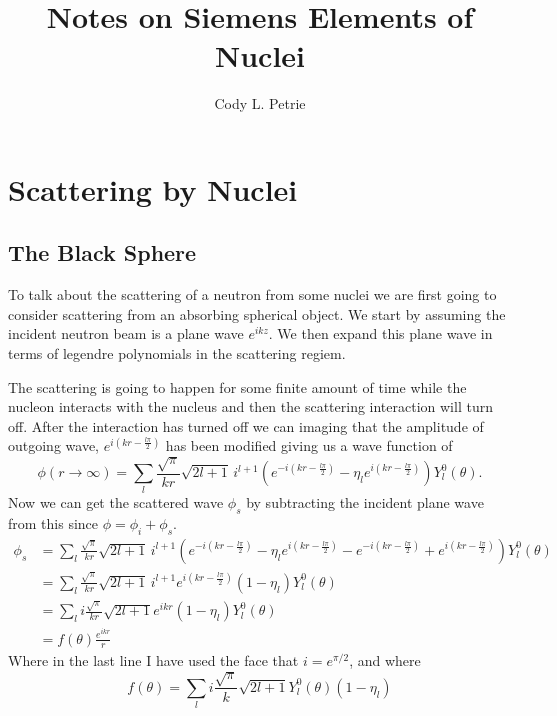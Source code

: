 \documentclass[12pt]{extarticle}
\title{Notes on Siemens Elements of Nuclei}
\author{Cody L. Petrie}
\begin{document}
\maketitle

\setcounter{section}{2}
\section{Scattering by Nuclei}
\subsection{The Black Sphere}
To talk about the scattering of a neutron from some nuclei we are first going to consider scattering from an absorbing spherical object. We start by assuming the incident neutron beam is a plane wave $e^{ikz}$. We then expand this plane wave in terms of legendre polynomials in the scattering regiem.



The scattering is going to happen for some finite amount of time while the nucleon interacts with the nucleus and then the scattering interaction will turn off. After the interaction has turned off we can imaging that the amplitude of outgoing wave, $e^{i(kr-\frac{l\pi}{2})}$ has been modified giving us a wave function of
\begin{equation}
   \phi(r\rightarrow\infty) = \sum\limits_l \frac{\sqrt{\pi}}{kr} \sqrt{2l+1} \, i^{l+1} \left( e^{-i(kr-\frac{l\pi}{2})} - \eta_l e^{i(kr-\frac{l\pi}{2})} \right) Y_l^0(\theta).
\end{equation}
Now we can get the scattered wave $\phi_s$ by subtracting the incident plane wave from this since $\phi = \phi_i + \phi_s$.
\begin{align}
   \phi_s &= \sum\limits_l \frac{\sqrt{\pi}}{kr} \sqrt{2l+1} \, i^{l+1} \left( e^{-i(kr-\frac{l\pi}{2})} - \eta_l e^{i(kr-\frac{l\pi}{2})} - e^{-i(kr-\frac{l\pi}{2})} + e^{i(kr-\frac{l\pi}{2})} \right) Y_l^0(\theta) \\
   &= \sum\limits_l \frac{\sqrt{\pi}}{kr} \sqrt{2l+1} \, i^{l+1} e^{i(kr-\frac{l\pi}{2})}(1 - \eta_l) Y_l^0(\theta) \\
   &= \sum\limits_l i \frac{\sqrt{\pi}}{kr} \sqrt{2l+1} e^{ikr}(1 - \eta_l) Y_l^0(\theta) \\
   &= f(\theta) \frac{e^{ikr}}{r}
\end{align}
Where in the last line I have used the face that $i=e^{\pi/2}$, and where
\begin{equation}
   f(\theta) = \sum\limits_l i \frac{\sqrt{\pi}}{k}\sqrt{2l+1} Y_l^0(\theta) (1-\eta_l)
   \label{eq:fullscatamp}
\end{equation}
\end{document}
